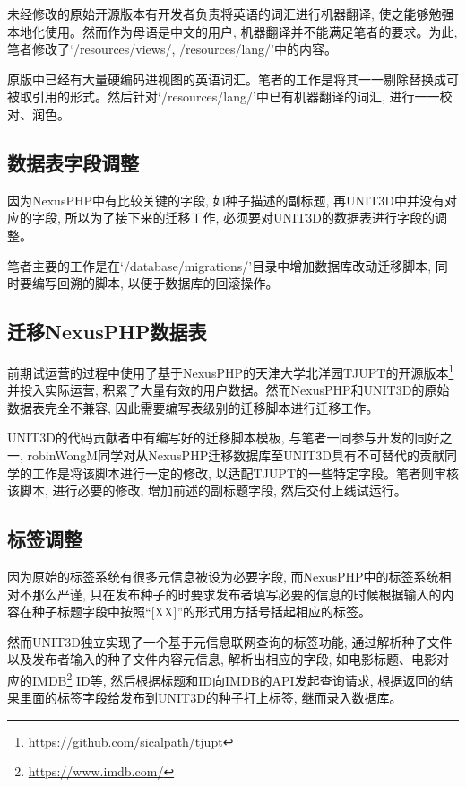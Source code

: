 未经修改的原始开源版本有开发者负责将英语的词汇进行机器翻译, 使之能够勉强本地化使用。然而作为母语是中文的用户, 机器翻译并不能满足笔者的要求。为此, 笔者修改了`/resources/views/, /resources/lang/'中的内容。

原版中已经有大量硬编码进视图的英语词汇。笔者的工作是将其一一剔除替换成可被取引用的形式。然后针对`/resources/lang/'中已有机器翻译的词汇, 进行一一校对、润色。


\subsection{数据表字段调整}

因为NexusPHP中有比较关键的字段, 如种子描述的副标题, 再UNIT3D中并没有对应的字段, 所以为了接下来的迁移工作, 必须要对UNIT3D的数据表进行字段的调整。

笔者主要的工作是在`/database/migrations/'目录中增加数据库改动迁移脚本, 同时要编写回溯的脚本, 以便于数据库的回滚操作。

\subsection{迁移NexusPHP数据表}

前期试运营的过程中使用了基于NexusPHP的天津大学北洋园TJUPT的开源版本\footnote{\url{https://github.com/sicalpath/tjupt}}并投入实际运营, 积累了大量有效的用户数据。然而NexusPHP和UNIT3D的原始数据表完全不兼容, 因此需要编写表级别的迁移脚本进行迁移工作。

UNIT3D的代码贡献者中有编写好的迁移脚本模板, 与笔者一同参与开发的同好之一, robinWongM同学对从NexusPHP迁移数据库至UNIT3D具有不可替代的贡献同学的工作是将该脚本进行一定的修改, 以适配TJUPT的一些特定字段。笔者则审核该脚本, 进行必要的修改, 增加前述的副标题字段, 然后交付上线试运行。

\subsection{标签调整}
\label{subsec:tagadjust}

因为原始的标签系统有很多元信息被设为必要字段, 而NexusPHP中的标签系统相对不那么严谨, 只在发布种子的时要求发布者填写必要的信息的时候根据输入的内容在种子标题字段中按照``[XX]''的形式用方括号括起相应的标签。 

然而UNIT3D独立实现了一个基于元信息联网查询的标签功能, 通过解析种子文件以及发布者输入的种子文件内容元信息, 解析出相应的字段, 如电影标题、电影对应的IMDB\footnote{\url{https://www.imdb.com/}} ID等, 然后根据标题和ID向IMDB的API发起查询请求, 根据返回的结果里面的标签字段给发布到UNIT3D的种子打上标签, 继而录入数据库。

